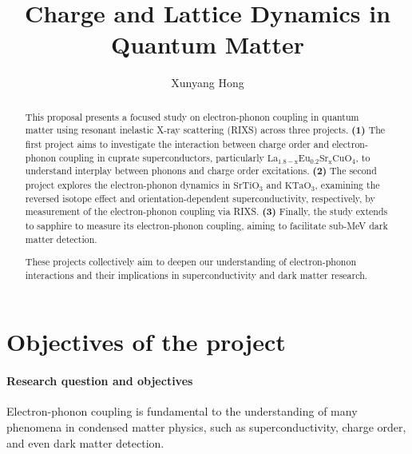 \documentclass[11pt]{article}
\begin{document}
\title{Charge and Lattice Dynamics in Quantum Matter}
\author{Xunyang Hong}
\date{}
\maketitle





\begin{abstract}
This proposal presents a focused study on electron-phonon coupling in quantum matter using resonant inelastic X-ray scattering (RIXS) across three projects. \textbf{(1)} The first project aims to investigate the interaction between charge order and electron-phonon coupling in cuprate superconductors, particularly $\mathrm{La_{1.8-x}Eu_{0.2}Sr_xCuO_{4}}$, to understand interplay between phonons and charge order excitations. \textbf{(2)} The second project explores the electron-phonon dynamics in $\mathrm{SrTiO_{3}}$ and $\mathrm{KTaO_{3}}$, examining the reversed isotope effect and orientation-dependent superconductivity, respectively, by measurement of the electron-phonon coupling via RIXS. \textbf{(3)} Finally, the study extends to sapphire to measure its electron-phonon coupling, aiming to facilitate sub-MeV dark matter detection.

These projects collectively aim to deepen our understanding of electron-phonon interactions and their implications in superconductivity and dark matter research.
\end{abstract}

\section{Objectives of the project}

\paragraph{Research question and objectives}
Electron-phonon coupling is fundamental to the understanding of many phenomena in condensed matter physics, such as superconductivity\cite{bardeen_theory_1957,cuk_review_2005}, charge order\cite{arpaia_charge_2021,comin_resonant_2016,tranquada_spins_2013}, and even dark matter detection\cite{griffin_directional_2018}. 
\end{document}
